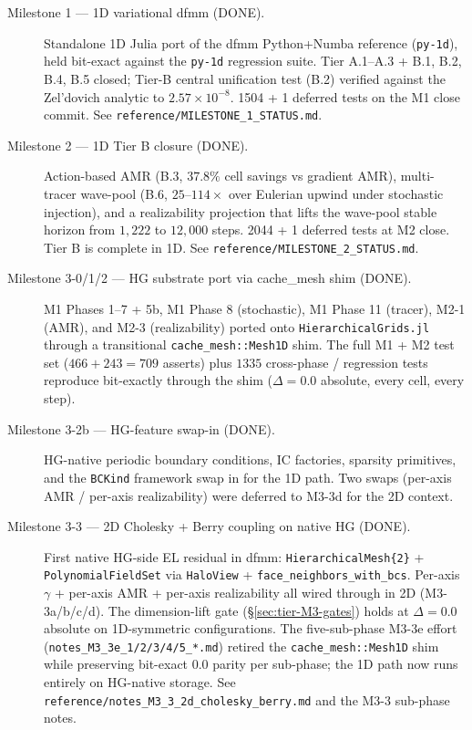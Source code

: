\documentclass[11pt]{article}
\begin{document}
\begin{description}
\item[Milestone 1 --- 1D variational dfmm (DONE).] Standalone 1D
Julia port of the dfmm Python+Numba reference (\texttt{py-1d}),
held bit-exact against the \texttt{py-1d} regression suite. Tier
A.1--A.3 + B.1, B.2, B.4, B.5 closed; Tier-B central unification
test (B.2) verified against the Zel'dovich analytic to
$2.57\times 10^{-8}$. 1504 + 1 deferred tests on the M1 close
commit. See \verb|reference/MILESTONE_1_STATUS.md|.
\item[Milestone 2 --- 1D Tier B closure (DONE).] Action-based AMR
(B.3, $37.8\%$ cell savings vs gradient AMR), multi-tracer
wave-pool (B.6, $25\text{--}114\times$ over Eulerian upwind under
stochastic injection), and a realizability projection that lifts
the wave-pool stable horizon from $1{,}222$ to $12{,}000$ steps.
2044 + 1 deferred tests at M2 close. Tier B is complete in 1D.
See \verb|reference/MILESTONE_2_STATUS.md|.
\item[Milestone 3-0/1/2 --- HG substrate port via cache\_mesh shim
(DONE).] M1 Phases 1--7 + 5b, M1 Phase 8 (stochastic), M1 Phase
11 (tracer), M2-1 (AMR), and M2-3 (realizability) ported onto
\texttt{HierarchicalGrids.jl} through a transitional
\texttt{cache\_mesh::Mesh1D} shim. The full M1 + M2 test set
($466 + 243 = 709$ asserts) plus $1335$ cross-phase / regression
tests reproduce bit-exactly through the shim ($\Delta = 0.0$
absolute, every cell, every step).
\item[Milestone 3-2b --- HG-feature swap-in (DONE).] HG-native
periodic boundary conditions, IC factories, sparsity primitives,
and the \texttt{BCKind} framework swap in for the 1D path. Two
swaps (per-axis AMR / per-axis realizability) were deferred to
M3-3d for the 2D context.
\item[Milestone 3-3 --- 2D Cholesky + Berry coupling on native HG
(DONE).] First native HG-side EL residual in dfmm:
\texttt{HierarchicalMesh\{2\}} + \texttt{PolynomialFieldSet} via
\texttt{HaloView} + \texttt{face\_neighbors\_with\_bcs}. Per-axis
$\gamma$ + per-axis AMR + per-axis realizability all wired through
in 2D (M3-3a/b/c/d). The dimension-lift gate
(\S\ref{sec:tier-M3-gates}) holds at $\Delta = 0.0$ absolute on
1D-symmetric configurations. The five-sub-phase M3-3e effort
(\verb|notes_M3_3e_1/2/3/4/5_*.md|) retired the
\texttt{cache\_mesh::Mesh1D} shim while preserving bit-exact 0.0
parity per sub-phase; the 1D path now runs entirely on HG-native
storage. See \verb|reference/notes_M3_3_2d_cholesky_berry.md| and
the M3-3 sub-phase notes.

\end{description}
\end{document}
